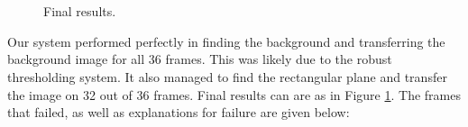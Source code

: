 \documentclass[11pt]{article}
\begin{document}
\begin{figure}[h]
  \centering
   ~
   \\
   ~
  \caption{Final results.}
  \label{fig:final}
\end{figure}

Our system performed perfectly in finding the background and transferring the background image for all 36 frames. This was likely due to the robust thresholding system. It also managed to find the rectangular plane and transfer the image on 32 out of 36 frames. Final results can are as in Figure \ref{fig:final}. The frames that failed, as well as explanations for failure are given below: 
\end{document}
